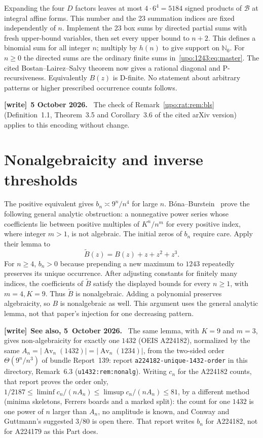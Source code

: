 \documentclass[11pt,letterpaper]{article}
\theoremstyle{remark}\newtheorem{remark}[theorem]{Remark}
\numberwithin{equation}{section}
\newcommand{\N}{\mathbb N_0}
\newcommand{\Av}{\operatorname{Av}}
\newcommand{\file}[1]{\nolinkurl{#1}}
\newenvironment{writenote}[1][]{\par\smallskip\begingroup\small
 \noindent\textbf{[write]}\if\relax\detokenize{#1}\relax\else~\textbf{#1.}\fi\ }%
 {\par\endgroup\smallskip}
\begin{document}
Expanding the four $D$ factors leaves at most $4\cdot6^4=5184$ signed
products of $\mathcal B$ at integral affine forms. This number and the
23 summation indices are fixed independently of $n$. Implement the
23 box sums by directed partial sums with fresh upper-bound variables,
then set every upper bound to $n+2$. This defines a binomial sum for all
integer $n$; multiply by $h(n)$ to give support on $\N$. For $n\ge0$
the directed sums are the ordinary finite sums in~\eqref{upo:1243:eq:master}.
The cited Bostan--Lairez--Salvy theorem now gives a rational diagonal and
P-recursiveness. Equivalently $B(z)$ is D-finite. No statement about
arbitrary patterns or higher prescribed occurrence counts follows.
\begin{writenote}[5 October 2026]
The check of Remark~\ref{upo:rat:rem:bls} (Definition~1.1, Theorem~3.5 and Corollary~3.6 of the cited arXiv version) applies to this encoding without change.
\end{writenote}

\section{Nonalgebraicity and inverse thresholds}\label{upo:1243:sec:inverse}
The positive equivalent gives $b_n\asymp9^n/n^4$ for large $n$.
B\'ona--Burstein~\cite[Lemma 6.3]{BB} prove the following general analytic
obstruction: a nonnegative power series whose coefficients lie between
positive multiples of $K^n/n^m$ for every positive index, where integer
$m>1$, is not algebraic. The initial zeros of $b_n$ require care.
Apply their lemma to
\[
 \widetilde B(z)=B(z)+z+z^2+z^3.
\]
For $n\ge4$, $b_n>0$ because prepending a new maximum to $1243$ repeatedly
preserves its unique occurrence. After adjusting constants for finitely
many indices, the coefficients of $\widetilde B$ satisfy the displayed
bounds for every $n\ge1$, with $m=4,K=9$. Thus $\widetilde B$ is
nonalgebraic. Adding a polynomial preserves algebraicity, so $B$ is
nonalgebraic as well. This argument uses the general analytic lemma,
not that paper's injection for one decreasing pattern.
\begin{writenote}[See also, 5~October 2026]
The same lemma, with $K=9$ and $m=3$, gives non-algebraicity for exactly
one $1432$ (OEIS A224182), normalized by the same
$A_n=|\Av_n(1432)|=|\Av_n(1234)|$, from the two-sided order
$\Theta(9^n/n^3)$ of bundle Report~139: report
\file{a224182-unique-1432-order} in this directory, Remark~6.3
(\texttt{u1432:rem:nonalg}). Writing $c_n$ for the A224182 counts, that
report proves the order only, $1/2187\le\liminf c_n/(nA_n)\le\limsup
c_n/(nA_n)\le81$, by a different method (minima skeletons, Ferrers boards
and a marked split): the count for one $1432$ is one power of $n$ larger
than $A_n$, no amplitude is known, and Conway and Guttmann's suggested
$3/80$ is open there. That report writes $b_n$ for A224182, not for
A224179 as this Part does.
\end{writenote}
\end{document}
